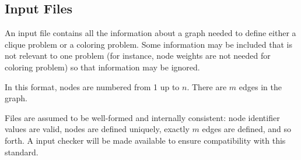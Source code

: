 \subsection{Input Files} 

An input file contains all the information about a graph needed to
define either a clique problem or a coloring problem.  Some
information may be included that is not relevant to one problem (for
instance, node weights are not needed for coloring problem) so that
information may be ignored.

In this format, nodes are numbered from 1 up to $n$.  There are $m$
edges in the graph.

Files are assumed to be well-formed and internally consistent: node
identifier values are valid, nodes are defined uniquely, exactly $m$
edges are defined, and so forth.  A input checker will be made
available to ensure compatibility with this standard.

